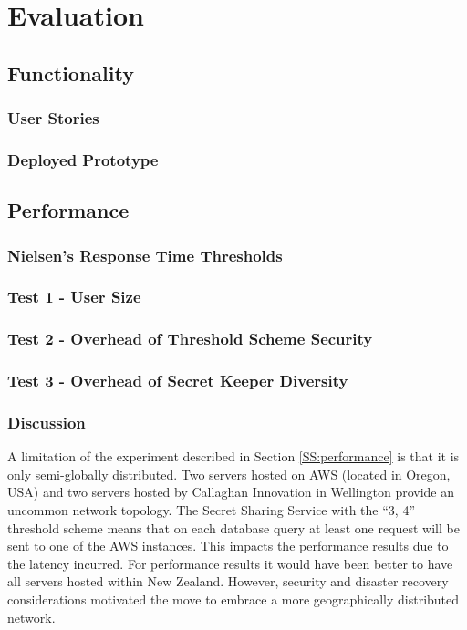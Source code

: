 \chapter{Evaluation}

\section{Functionality}

\subsection{User Stories}

\subsection{Deployed Prototype}

\section{Performance}

\subsection{Nielsen's Response Time Thresholds}

\subsection{Test 1 - User Size}

\subsection{Test 2 - Overhead of Threshold Scheme Security}

\subsection{Test 3 - Overhead of Secret Keeper Diversity}

\subsection{Discussion}

A limitation of the experiment described in Section \ref{SS:performance} is that it is only semi-globally distributed. Two servers hosted on AWS (located in Oregon, USA) and two servers hosted by Callaghan Innovation in Wellington provide an uncommon network topology. The Secret Sharing Service with the ``3, 4'' threshold scheme means that on each database query at least one request will be sent to one of the AWS instances. This impacts the performance results due to the latency incurred. For performance results it would have been better to have all servers hosted within New Zealand. However, security and disaster recovery considerations motivated the move to embrace a more geographically distributed network.


